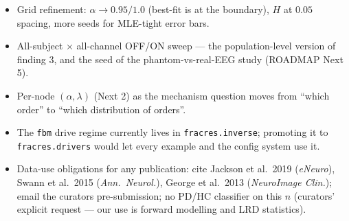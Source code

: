 \documentclass[11pt]{article}
\begin{document}
\begin{itemize}[leftmargin=1.6em]
  \item Grid refinement: $\alpha \to 0.95/1.0$ (best-fit is at the boundary),
        $H$ at $0.05$ spacing, more seeds for MLE-tight error bars.
  \item All-subject $\times$ all-channel OFF/ON sweep --- the population-level
        version of finding 3, and the seed of the phantom-vs-real-EEG study
        (ROADMAP Next 5).
  \item Per-node $(\alpha, \lambda)$ (Next 2) as the mechanism question moves
        from ``which order'' to ``which distribution of orders''.
  \item The \texttt{fbm} drive regime currently lives in
        \texttt{fracres.inverse}; promoting it to \texttt{fracres.drivers}
        would let every example and the config system use it.
  \item Data-use obligations for any publication: cite Jackson et al.\ 2019
        (\emph{eNeuro}), Swann et al.\ 2015 (\emph{Ann.\ Neurol.}), George et
        al.\ 2013 (\emph{NeuroImage Clin.}); email the curators
        pre-submission; no PD/HC classifier on this $n$ (curators' explicit
        request --- our use is forward modelling and LRD statistics).
\end{itemize}
\end{document}
